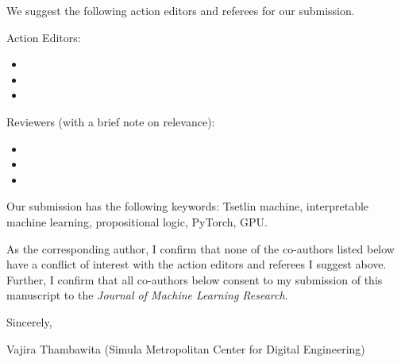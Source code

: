 We suggest the following action editors and referees for our submission.

Action Editors:
\begin{itemize}
    \item {}
    \item {}
    \item {}
\end{itemize}

Reviewers (with a brief note on relevance):
\begin{itemize}
    \item {}
    \item {}
    \item {}
\end{itemize}

Our submission has the following keywords: Tsetlin machine, interpretable machine learning,
propositional logic, PyTorch, GPU.

As the corresponding author, I confirm that none of the co-authors listed below have a conflict
of interest with the action editors and referees I suggest above. Further, I confirm that all
co-authors below consent to my submission of this manuscript to the \emph{Journal of Machine
Learning Research}.

\bigskip

Sincerely,

\medskip

Vajira Thambawita (Simula Metropolitan Center for Digital Engineering)\\


